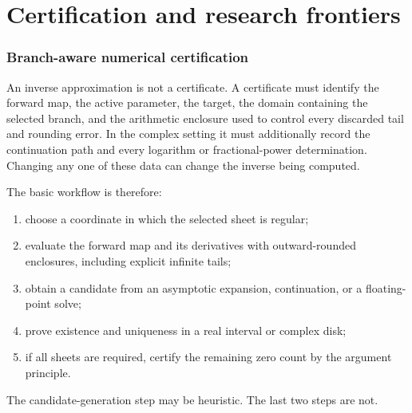 
\newcommand{\CertifiedEnclosureCenter}[1]{\widehat{#1}}
\newcommand{\FormalGevreySeriesSymbol}[1]{\widehat{#1}}

\part{Certification and research frontiers}

\section{Branch-aware numerical certification}
\label{sec:certification-frontiers}

An inverse approximation is not a certificate.  A certificate must identify
the forward map, the active parameter, the target, the domain containing the
selected branch, and the arithmetic enclosure used to control every discarded
tail and rounding error.  In the complex setting it must additionally record
the continuation path and every logarithm or fractional-power determination.
Changing any one of these data can change the inverse being computed.

The basic workflow is therefore:
\begin{enumerate}
\item choose a coordinate in which the selected sheet is regular;
\item evaluate the forward map and its derivatives with outward-rounded
      enclosures, including explicit infinite tails;
\item obtain a candidate from an asymptotic expansion, continuation, or a
      floating-point solve;
\item prove existence and uniqueness in a real interval or complex disk;
\item if all sheets are required, certify the remaining zero count by the
      argument principle.
\end{enumerate}
The candidate-generation step may be heuristic.  The last two steps are not.

